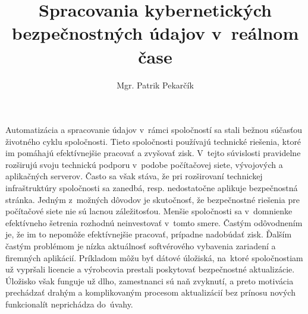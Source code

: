 \documentclass[thesismargins, thesislinespacing, openright, upjsfrontpage]{rnthesis}
\title{Spracovania kybernetických bezpečnostných údajov v reálnom čase}
\author{Mgr. Patrik Pekarčík}
\begin{document}
\maketitle
\tableofcontents

\uvod



% 

Automatizácia a spracovanie údajov v~rámci spoločností sa stali bežnou súčasťou životného cyklu spoločnosti. Tieto spoločnosti používajú technické riešenia, ktoré im pomáhajú efektívnejšie pracovať a zvyšovať zisk. V~tejto súvislosti pravidelne rozširujú svoju technickú podporu v~podobe počítačovej siete, vývojových a aplikačných serverov. Často sa však stáva, že pri rozširovaní technickej infraštruktúry spoločnosti sa zanedbá, resp. nedostatočne aplikuje bezpečnostná stránka. Jedným z~možných dôvodov je skutočnosť, že bezpečnostné riešenia pre počítačové siete nie sú lacnou záležitosťou. Menšie spoločnosti sa v~domnienke efektívneho šetrenia rozhodnú neinvestovať v~tomto smere. Častým odôvodnením je, že im to nepomôže efektívnejšie pracovať, prípadne nadobúdať zisk. Ďalším častým problémom je nízka aktuálnosť softvérového vybavenia zariadení a firemných aplikácií. Príkladom môžu byť dátové úložiská, na~ktoré spoločnostiam už vypršali licencie a výrobcovia prestali poskytovať bezpečnostné aktualizácie. Úložisko však funguje už dlho, zamestnanci sú naň zvyknutí, a preto motivácia prechádzať drahým a komplikovaným procesom aktualizácií bez prínosu nových funkcionalít neprichádza do~úvahy.
\end{document}
